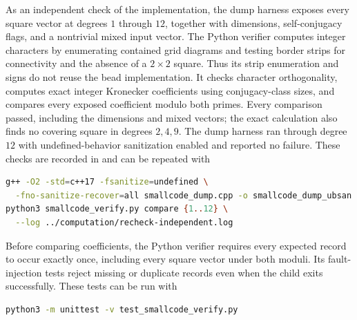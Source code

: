 As an independent check of the implementation, the dump harness exposes
every square vector at degrees $1$ through $12$, together with dimensions,
self-conjugacy flags, and a nontrivial mixed input vector.  The Python
verifier computes integer characters by enumerating contained grid
diagrams and testing border strips for connectivity and the absence of a
$2\times2$ square.  Thus its strip enumeration and signs do not reuse the
bead implementation.  It checks character orthogonality, computes exact
integer Kronecker coefficients using conjugacy-class sizes, and compares
every exposed coefficient modulo both primes.  Every comparison passed,
including the dimensions and mixed vectors; the exact calculation also
finds no covering square in degrees $2,4,9$. The dump harness ran through
degree $12$ with undefined-behavior sanitization enabled and reported
no failure. These checks
are recorded in 
and can be repeated with
\begin{lstlisting}[language=bash,basicstyle=\ttfamily\footnotesize]
g++ -O2 -std=c++17 -fsanitize=undefined \
  -fno-sanitize-recover=all smallcode_dump.cpp -o smallcode_dump_ubsan
python3 smallcode_verify.py compare {1..12} \
  --log ../computation/recheck-independent.log
\end{lstlisting}
Before comparing coefficients, the Python verifier requires every
expected record to occur exactly once, including every square vector
under both moduli. Its fault-injection tests reject missing or duplicate
records even when the child exits successfully. These tests can be run with
\begin{lstlisting}[language=bash,basicstyle=\ttfamily\footnotesize]
python3 -m unittest -v test_smallcode_verify.py
\end{lstlisting}
